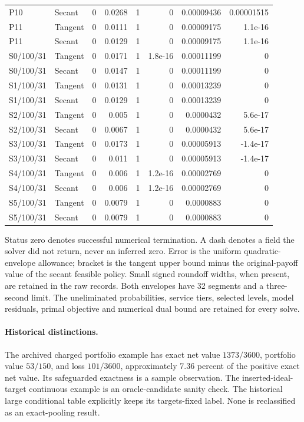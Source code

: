 \begin{longtable}{llrrrrrr}
P10 & Secant & 0 & 0.0268 & 1 & 0 & 0.00009436 & 0.00001515 \\
P11 & Tangent & 0 & 0.0111 & 1 & 0 & 0.00009175 & 1.1e-16 \\
P11 & Secant & 0 & 0.0129 & 1 & 0 & 0.00009175 & 1.1e-16 \\
S0/100/31 & Tangent & 0 & 0.0171 & 1 & 1.8e-16 & 0.00011199 & 0 \\
S0/100/31 & Secant & 0 & 0.0147 & 1 & 0 & 0.00011199 & 0 \\
S1/100/31 & Tangent & 0 & 0.0131 & 1 & 0 & 0.00013239 & 0 \\
S1/100/31 & Secant & 0 & 0.0129 & 1 & 0 & 0.00013239 & 0 \\
S2/100/31 & Tangent & 0 & 0.005 & 1 & 0 & 0.0000432 & 5.6e-17 \\
S2/100/31 & Secant & 0 & 0.0067 & 1 & 0 & 0.0000432 & 5.6e-17 \\
S3/100/31 & Tangent & 0 & 0.0173 & 1 & 0 & 0.00005913 & -1.4e-17 \\
S3/100/31 & Secant & 0 & 0.011 & 1 & 0 & 0.00005913 & -1.4e-17 \\
S4/100/31 & Tangent & 0 & 0.006 & 1 & 1.2e-16 & 0.00002769 & 0 \\
S4/100/31 & Secant & 0 & 0.006 & 1 & 1.2e-16 & 0.00002769 & 0 \\
S5/100/31 & Tangent & 0 & 0.0079 & 1 & 0 & 0.0000883 & 0 \\
S5/100/31 & Secant & 0 & 0.0079 & 1 & 0 & 0.0000883 & 0 \\
\bottomrule
\end{longtable}
Status zero denotes successful numerical termination. A dash denotes a field the solver did not return, never an inferred zero. Error is the uniform quadratic-envelope allowance; bracket is the tangent upper bound minus the original-payoff value of the secant feasible policy. Small signed roundoff widths, when present, are retained in the raw records. Both envelopes have 32 segments and a three-second limit. The uneliminated probabilities, service tiers, selected levels, model residuals, primal objective and numerical dual bound are retained for every solve.

\paragraph{Historical distinctions.}
The archived charged portfolio example has exact net value $1373/3600$, portfolio value $53/150$, and loss $101/3600$, approximately 7.36 percent of the positive exact net value. Its safeguarded exactness is a sample observation. The inserted-ideal-target continuous example is an oracle-candidate sanity check. The historical large conditional table explicitly keeps its targets-fixed label. None is reclassified as an exact-pooling result.
